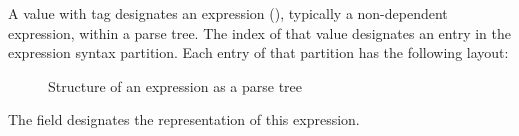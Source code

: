 A  value with tag  designates an expression
(), typically a non-dependent expression, within a parse tree.  The index of that
value designates an entry in the expression syntax partition.  Each entry of that partition has the following
layout:
%
\begin{figure}[H]
	\centering
	\caption{Structure of an expression as a parse tree}
	\label{fig:ifc:SyntaxSort:Expression}
\end{figure}
%
The  field designates the representation of this expression.



\subsection{}
\label{sec:ifc:SyntaxSort:FunctionDefinition}

\begin{Structure}
	\label{fig:ifc:SyntaxSort:FunctionDefinition}
\end{Structure}



\subsection{}
\label{sec:ifc:SyntaxSort:MemberFunctionDeclaration}

\begin{Structure}
	\label{fig:ifc:SyntaxSort:MemberFunctionDeclaration}
\end{Structure}



